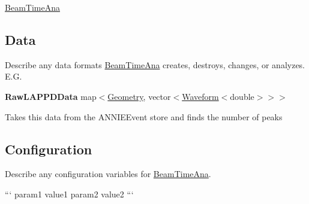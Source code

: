 \hyperlink{classBeamTimeAna}{Beam\-Time\-Ana}

\subsection*{Data}

Describe any data formats \hyperlink{classBeamTimeAna}{Beam\-Time\-Ana} creates, destroys, changes, or analyzes. E.\-G.

{\bfseries Raw\-L\-A\-P\-P\-D\-Data} {\ttfamily map$<$\hyperlink{classGeometry}{Geometry}, vector$<$\hyperlink{classWaveform}{Waveform}$<$double$>$$>$$>$}
\begin{DoxyItemize}
\item Takes this data from the {\ttfamily A\-N\-N\-I\-E\-Event} store and finds the number of peaks
\end{DoxyItemize}

\subsection*{Configuration}

Describe any configuration variables for \hyperlink{classBeamTimeAna}{Beam\-Time\-Ana}.

``` param1 value1 param2 value2 ``` 